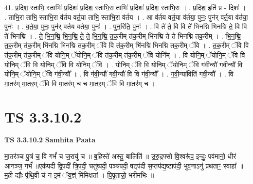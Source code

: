 \documentclass[17pt]{extarticle}
\begin{document}
41. प्र॒दिश॒ स्ताभि॒ स्ताभिः॑ प्र॒दिशः॑ प्र॒दिश॒ स्ताभि॒रा ताभिः॑ प्र॒दिशः॑ प्र॒दिश॒ स्ताभि॒रा । . प्र॒दिश॒ इति॑ प्र - दिशः॑ । . ताभि॒रा ताभि॒ स्ताभि॒रा व॑र्तय वर्त॒या ताभि॒ स्ताभि॒रा व॑र्तय । . आ व॑र्तय वर्त॒या व॑र्तया॒ पुनः॒ पुन॑र् वर्त॒या व॑र्तया॒ पुनः॑ । . व॒र्त॒या॒ पुनः॒ पुन॑र् वर्तय वर्तया॒ पुनः॑ । . पुन॒रिति॒ पुनः॑ । . वि ते॑ ते॒ वि वि ते॑ भिनद्मि भिनद्मि ते॒ वि वि ते॑ भिनद्मि । . ते॒ भि॒न॒द्मि॒ भि॒न॒द्मि॒ ते॒ ते॒ भि॒न॒द्मि॒ त॒क॒रीम् त॑क॒रीम् भि॑नद्मि ते ते भिनद्मि तक॒रीम् । . भि॒न॒द्मि॒ त॒क॒रीम् त॑क॒रीम् भि॑नद्मि भिनद्मि तक॒रीम् ॅवि वि त॑क॒रीम् भि॑नद्मि भिनद्मि तक॒रीम् ॅवि । . त॒क॒रीम् ॅवि वि त॑क॒रीम् त॑क॒रीम् ॅवि योनि॒म् ॅयोनि॒म् ॅवि त॑क॒रीम् त॑क॒रीम् ॅवि योनि᳚म् । . वि योनि॒म् ॅयोनि॒म् ॅवि वि योनि॒म् ॅवि वि योनि॒म् ॅवि वि योनि॒म् ॅवि । . योनि॒म् ॅवि वि योनि॒म् ॅयोनि॒म् ॅवि ग॑वी॒न्यौ॑ गवी॒न्यौ॑ वि योनि॒म् ॅयोनि॒म् ॅवि ग॑वी॒न्यौ᳚ । . वि ग॑वी॒न्यौ॑ गवी॒न्यौ॑ वि वि ग॑वी॒न्यौ᳚ । . ग॒वी॒न्या॑विति॑ गवी॒न्यौ᳚ । . वि मा॒तर॑म् मा॒तर॒म् ॅवि वि मा॒तर॑म् च च मा॒तर॒म् ॅवि वि मा॒तर॑म् च । \newline
\pagebreak
{}

\section{ TS 3.3.10.2 }

\textbf{TS 3.3.10.2 } \newline
\textbf{Samhita Paata} \newline

मा॒तर॑ञ्च पु॒त्रं च॒ वि गर्भं॑ च ज॒रायु॑ च ॥ ब॒हिस्ते॑ अस्तु॒ बालिति॑ ॥ उ॒रु॒द्र॒फ्सो वि॒श्वरू॑प॒ इन्दुः॒ पव॑मानो॒ धीर॑ आनञ्ज॒ गर्भं᳚ ॥एक॑पदी द्वि॒पदी᳚ त्रि॒पदी॒ चतु॑ष्पदी॒ पञ्च॑पदी॒ षट्प॑दी स॒प्तप॑द्य॒ष्टाप॑दी॒ भुव॒नाऽनु॑ प्रथताꣳ॒॒ स्वाहा᳚ ॥ म॒ही द्यौः पृ॑थि॒वी च॑ न इ॒मं ॅय॒ज्ञ्ं मि॑मिक्षतां । पि॒पृ॒तान्नो॒ भरी॑मभिः ॥ \newline
\end{document}
